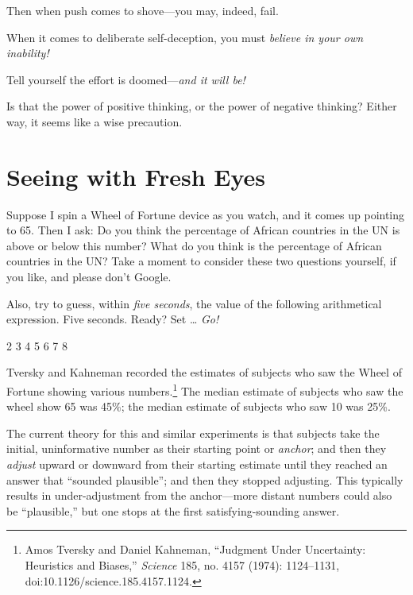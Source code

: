 {
 Then when push comes to shove---you may, indeed, fail.}

{
 When it comes to deliberate self-deception, you must
\textit{believe in your own inability!}}

{
 Tell yourself the effort is doomed---\textit{and it will be!}}

{
 Is that the power of positive thinking, or the power of negative
thinking? Either way, it seems like a wise precaution.}

\myendsectiontext

\chapter{Seeing with Fresh Eyes}


{
 Suppose I spin a Wheel of Fortune device as you watch, and it
comes up pointing to 65. Then I ask: Do you think the percentage of
African countries in the UN is above or below this number? What do you
think is the percentage of African countries in the UN? Take a moment
to consider these two questions yourself, if you like, and please
don't Google. }

{
 Also, try to guess, within \textit{five seconds}, the value of the
following arithmetical expression. Five seconds. Ready? Set \ldots
\textit{Go!}}

{ {\texttimes} 2 {\texttimes} 3 {\texttimes} 4 {\texttimes} 5
{\texttimes} 6 {\texttimes} 7 {\texttimes} 8
\par}


\bigskip

{
 Tversky and Kahneman recorded the estimates of subjects who saw
the Wheel of Fortune showing various numbers.\footnote{Amos Tversky and Daniel Kahneman, ``Judgment
Under Uncertainty: Heuristics and Biases,''
\textit{Science} 185, no. 4157 (1974): 1124--1131,
doi:10.1126/science.185.4157.1124.} The
median estimate of subjects who saw the wheel show 65 was 45\%; the
median estimate of subjects who saw 10 was 25\%. }

{
 The current theory for this and similar experiments is that
subjects take the initial, uninformative number as their starting point
or \textit{anchor}; and then they \textit{adjust} upward or downward
from their starting estimate until they reached an answer that
``sounded plausible''; and then they
stopped adjusting. This typically results in under-adjustment from the
anchor---more distant numbers could also be
``plausible,'' but one stops at the
first satisfying-sounding answer.}

